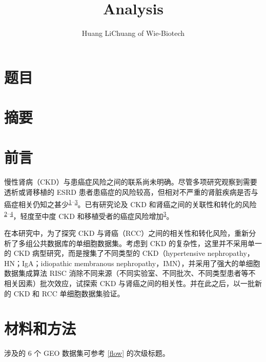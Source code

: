 \documentclass[
]{article}
\title{Analysis}
\author{Huang LiChuang of Wie-Biotech}
\date{}
\begin{document}
\maketitle

{
\setcounter{tocdepth}{4}
\tableofcontents
}
\listoffigures

\listoftables

\hypertarget{ux9898ux76ee}{%
\section{题目}\label{ux9898ux76ee}}

\hypertarget{abstract}{%
\section{摘要}\label{abstract}}

\hypertarget{introduction}{%
\section{前言}\label{introduction}}

慢性肾病（CKD）与患癌症风险之间的联系尚未明确。尽管多项研究观察到需要透析或肾移植的 ESRD 患者患癌症的风险较高，但相对不严重的肾脏疾病是否与癌症相关仍知之甚少\textsuperscript{\protect\hyperlink{ref-OnconephrologyRosner2021}{1}--\protect\hyperlink{ref-CancerRiskAndKitchl2022}{3}}。已有研究论及 CKD 和肾癌之间的关联性和转化的风险\textsuperscript{\protect\hyperlink{ref-CkdAndTheRisLowran2014}{2}--\protect\hyperlink{ref-RenalCellCancSaly2021}{4}}，轻度至中度 CKD 和移植受者的癌症风险增加\textsuperscript{\protect\hyperlink{ref-CancerRiskAndKitchl2022}{3}}。

在本研究中，为了探究 CKD 与肾癌（RCC）之间的相关性和转化风险，重新分析了多组公共数据库的单细胞数据集。考虑到 CKD 的复杂性，这里并不采用单一的 CKD 病型研究，而是搜集了不同类型的 CKD（hypertensive nephropathy，HN；IgA；idiopathic membranous nephropathy，IMN），并采用了强大的单细胞数据集成算法 RISC 消除不同来源（不同实验室、不同批次、不同类型患者等不相关因素）批次效应，试探索 CKD 与肾癌之间的相关性。并在此之后，以一批新的 CKD 和 RCC 单细胞数据集验证。

\hypertarget{methods}{%
\section{材料和方法}\label{methods}}

涉及的 6 个 GEO 数据集可参考 \ref{flow} 的次级标题。
\end{document}
